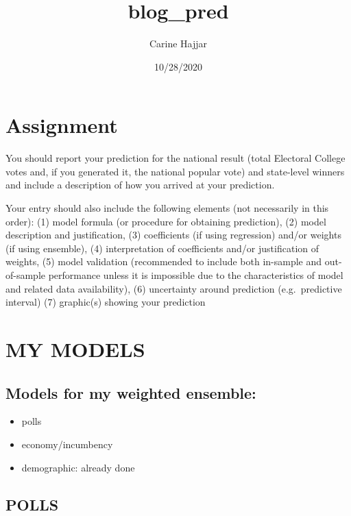 \documentclass[
]{article}
\title{blog\_pred}
\author{Carine Hajjar}
\date{10/28/2020}
\providecommand{\tightlist}{%
  \setlength{\itemsep}{0pt}\setlength{\parskip}{0pt}}
\begin{document}
\maketitle

\hypertarget{assignment}{%
\section{Assignment}\label{assignment}}

You should report your prediction for the national result (total
Electoral College votes and, if you generated it, the national popular
vote) and state-level winners and include a description of how you
arrived at your prediction.

Your entry should also include the following elements (not necessarily
in this order): (1) model formula (or procedure for obtaining
prediction), (2) model description and justification, (3) coefficients
(if using regression) and/or weights (if using ensemble), (4)
interpretation of coefficients and/or justification of weights, (5)
model validation (recommended to include both in-sample and
out-of-sample performance unless it is impossible due to the
characteristics of model and related data availability), (6) uncertainty
around prediction (e.g.~predictive interval) (7) graphic(s) showing your
prediction

\hypertarget{my-models}{%
\section{MY MODELS}\label{my-models}}

\hypertarget{models-for-my-weighted-ensemble}{%
\subsection{Models for my weighted
ensemble:}\label{models-for-my-weighted-ensemble}}

\begin{itemize}
\tightlist
\item
  polls
\item
  economy/incumbency
\item
  demographic: already done
\end{itemize}

\hypertarget{polls}{%
\subsection{POLLS}\label{polls}}
\end{document}
